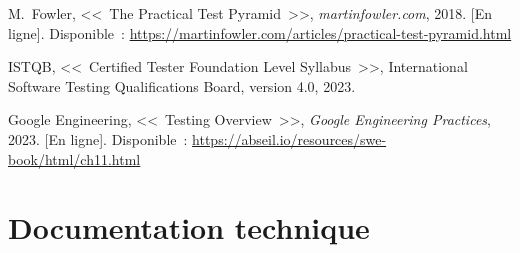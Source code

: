 \begin{enumerate}[label={[\arabic*]}, leftmargin=2cm, resume]

\item \label{bib:fowler-pyramid} M.~Fowler, <<~The Practical Test Pyramid~>>,
  \textit{martinfowler.com}, 2018. [En ligne]. Disponible~:
  \url{https://martinfowler.com/articles/practical-test-pyramid.html}

\item \label{bib:istqb} ISTQB, <<~Certified Tester Foundation Level Syllabus~>>,
  International Software Testing Qualifications Board, version 4.0, 2023.

\item \label{bib:google-testing} Google Engineering, <<~Testing Overview~>>,
  \textit{Google Engineering Practices}, 2023. [En ligne]. Disponible~:
  \url{https://abseil.io/resources/swe-book/html/ch11.html}

\end{enumerate}

\section*{Documentation technique}

